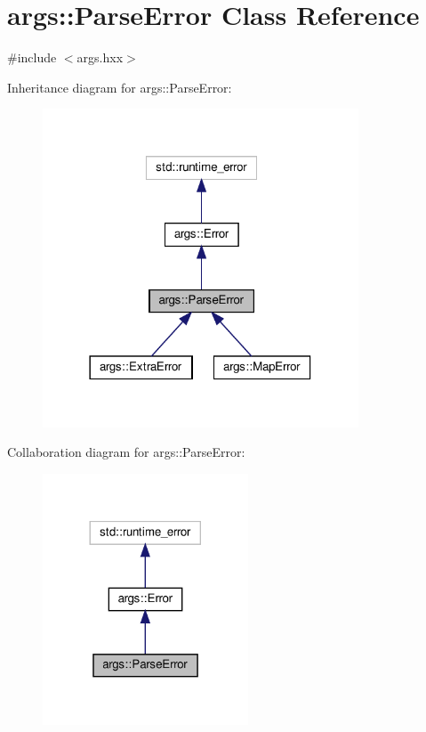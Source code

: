 \hypertarget{classargs_1_1_parse_error}{}\section{args\+:\+:Parse\+Error Class Reference}
\label{classargs_1_1_parse_error}


{\ttfamily \#include $<$args.\+hxx$>$}



Inheritance diagram for args\+:\+:Parse\+Error\+:\nopagebreak
\begin{figure}[H]
\begin{center}
\leavevmode
\includegraphics[width=266pt]{classargs_1_1_parse_error__inherit__graph}
\end{center}
\end{figure}


Collaboration diagram for args\+:\+:Parse\+Error\+:\nopagebreak
\begin{figure}[H]
\begin{center}
\leavevmode
\includegraphics[width=173pt]{classargs_1_1_parse_error__coll__graph}
\end{center}
\end{figure}
